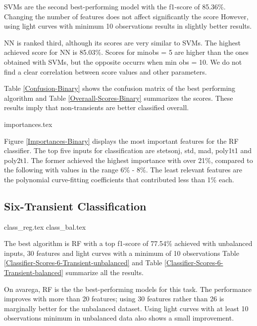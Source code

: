 \documentclass[a4paper,fleqn,usenatbib]{mnras}
\begin{document}
SVMs are the second best-performing model with the  f1-score of 85.36\%. 
Changing the number of features does not affect significantly the score
However, using light curves with minimum 10 observations results in
slightly better results. 

NN is ranked third, although its scores are very similar to SVMs. 
The highest achieved score for NN is 85.03\%.
Scores for min\textunderscore obs = 5 are higher than the ones
obtained with SVMs, but the opposite occurrs when min\textunderscore
obs = 10.  
We do not find a clear correlation between score values and other
parameters.  

Table \ref{Confusion-Binary} shows the confusion matrix of the best
performing algorithm and Table \ref{Overaall-Scores-Binary} summarizes
the scores.
These results imply that non-transients are better classified overall.  


{importances.tex}

Figure \ref{Importances-Binary} displays the most important features
for the RF classifier.
The top five inputs for classification are stetson\textunderscore j,
std, mad, poly1\textunderscore t1 and poly2\textunderscore t1.  
The former achieved the highest importance with over 21\%, compared to
the following with values in the range 6\% - 8\%. 
The least relevant features are the polynomial curve-fitting
coefficients that contributed less than 1\% each.


\subsection{Six-Transient Classification}

{class_reg.tex}
{class_bal.tex}

The best algorithm is RF with a top f1-score of 77.54\% achieved with 
unbalanced inputs, 30 features and light curves with a minimum of 10 observations
Table \ref{Classifier-Scores-6-Transient-unbalanced} and Table
\ref{Classifier-Scores-6-Transient-balanced} summarize all the
results. 
 
On avarega, RF is the the best-performing models for this
task. 
The performance improves with more than 20 features; using 30 features rather than 26
is marginally better for the unbalanced dataset. 
Using light curves with at least 10 observations minimum
in unbalanced data also shows a small improvement.
\end{document}
